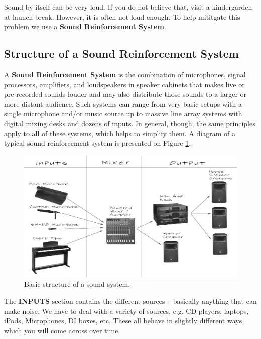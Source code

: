 \documentclass[14pt,twocolumn]{extarticle} %
\begin{document}
Sound by itself can be very loud. If you do not believe that, visit a kindergarden at launch break. However, it is often not loud enough. To help mititgate this problem we use a \textbf{Sound Reinforcement System}. 

\subsection{Structure of a Sound Reinforcement System}
\label{sound-system-structure}
A \textbf{Sound Reinforcement System} is the combination of microphones, signal processors, amplifiers, and loudspeakers in speaker cabinets that makes live or pre-recorded sounds louder and may also distribute those sounds to a larger or more distant audience. Such systems can range from very basic setups with a single microphone and/or music source up to massive line array systems with digital mixing desks and dozens of inputs. In general, though, the same principles apply to all of these systems, which helps to simplify them. A diagram of a typical sound reinforcement system is presented on Figure \ref{fig:intro}.

\begin{figure}[h]
\begin{center}

\includegraphics[width=18cm]{audio_labeled_diagram.jpg}
\caption{Basic structure of a sound system.}
\label{fig:intro}

\end{center}
\end{figure}

The \textbf{INPUTS} section contains the different sources – basically anything that can make noise. We have to deal with a variety of sources, e.g. CD players, laptops, iPods, Microphones, DI boxes, etc. These all behave in slightly different ways which you will come across over time.
\end{document}

